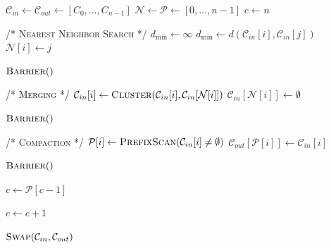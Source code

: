 \begin{algorithm}[h!tb]
\caption{PLOC algorithm pseudocode. The input of the algorithm is a sequence of $n$ clusters $C_0, C_1, \dots , C_{n-1}$ sorted along the Morton curve. Two auxiliary arrays are used: $\mathcal{N}$ (nearest neighbor indices) and $\mathcal{P}$ (exclusive prefix scan). The symbol $\emptyset$ denotes an invalid cluster. \cite{MB17}}
\label{alg:ploc}
\begin{algorithmic}[1]
    
\State $\mathcal{C}_{in} \gets \mathcal{C}_{out} \gets [C_0,\dots,C_{n-1}]$
\State $\mathcal{N} \gets \mathcal{P} \gets [0,\dots,n-1]$
\State $c \gets n$

        
        \color{nncolor}
        \State /* \textsc{Nearest Neighbor Search} */
        \State $d_{\min} \gets \infty$
                \State $d_{\min} \gets d(\mathcal{C}_{in}[i],\mathcal{C}_{in}[j])$
                \State $\mathcal{N}[i] \gets j$
            \EndIf
        \EndFor
        
        \color{black}
        \State $\textsc{Barrier}()$
        
        \color{mergecolor}
        \State /* \textsc{Merging} */
            \State $\mathcal{C}_{in}[i] \gets \textsc{Cluster}(\mathcal{C}_{in}[i],\mathcal{C}_{in}[\mathcal{N}[i]])$
            \State $\mathcal{C}_{in}[\mathcal{N}[i]] \gets %
            \emptyset$
        \EndIf
        
        \color{black}
        \State $\textsc{Barrier}()$
        
        \color{compactcolor}
        \State /* \textsc{Compaction} */
        \State $\mathcal{P}[i] \gets \textsc{PrefixScan}(\mathcal{C}_{in}[i] \ne %
        \emptyset)$
            \State $\mathcal{C}_{out}[\mathcal{P}[i]] \gets \mathcal{C}_{in}[i]$
        \EndIf
        
        \color{black}
        \State $\textsc{Barrier}()$
        
    \EndFor
    
    \State $c \gets \mathcal{P}[c-1]$
    
        \State $c \gets c+1$
    \EndIf
    
    \State $\textsc{Swap}(\mathcal{C}_{in},\mathcal{C}_{out})$
    
\EndWhile

\end{algorithmic}
\end{algorithm}


